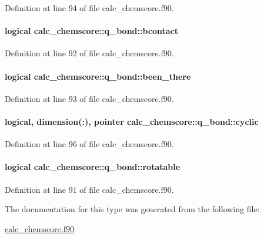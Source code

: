 Definition at line 94 of file calc\-\_\-chemscore.\-f90.

\hypertarget{structcalc__chemscore_1_1q__bond_a18fdd505bce8f6acbd49cf99010d05bc}{
\paragraph[{bcontact}]{\setlength{\rightskip}{0pt plus 5cm}logical calc\-\_\-chemscore\-::q\-\_\-bond\-::bcontact}}\label{structcalc__chemscore_1_1q__bond_a18fdd505bce8f6acbd49cf99010d05bc}


Definition at line 92 of file calc\-\_\-chemscore.\-f90.

\hypertarget{structcalc__chemscore_1_1q__bond_a2ac95d010aaab835c13180975ec2eac2}{
\paragraph[{been\-\_\-there}]{\setlength{\rightskip}{0pt plus 5cm}logical calc\-\_\-chemscore\-::q\-\_\-bond\-::been\-\_\-there}}\label{structcalc__chemscore_1_1q__bond_a2ac95d010aaab835c13180975ec2eac2}


Definition at line 93 of file calc\-\_\-chemscore.\-f90.

\hypertarget{structcalc__chemscore_1_1q__bond_a4571c0cb4812a7c125d3160f07f9e384}{
\paragraph[{cyclic}]{\setlength{\rightskip}{0pt plus 5cm}logical, dimension(\-:), pointer calc\-\_\-chemscore\-::q\-\_\-bond\-::cyclic}}\label{structcalc__chemscore_1_1q__bond_a4571c0cb4812a7c125d3160f07f9e384}


Definition at line 96 of file calc\-\_\-chemscore.\-f90.

\hypertarget{structcalc__chemscore_1_1q__bond_aa83f76483887f14b56530a0c6b7fbcdd}{
\paragraph[{rotatable}]{\setlength{\rightskip}{0pt plus 5cm}logical calc\-\_\-chemscore\-::q\-\_\-bond\-::rotatable}}\label{structcalc__chemscore_1_1q__bond_aa83f76483887f14b56530a0c6b7fbcdd}


Definition at line 91 of file calc\-\_\-chemscore.\-f90.



The documentation for this type was generated from the following file\-:\begin{DoxyCompactItemize}
\item 
\hyperlink{calc__chemscore_8f90}{calc\-\_\-chemscore.\-f90}\end{DoxyCompactItemize}
